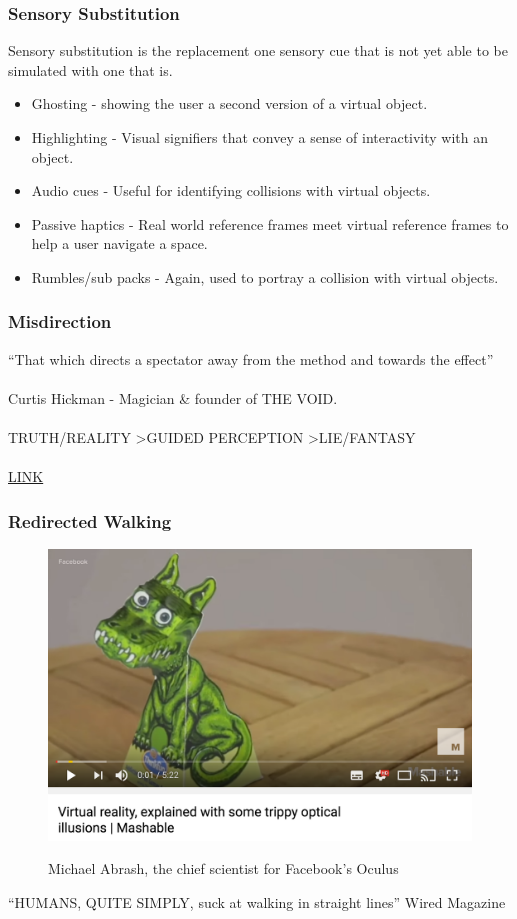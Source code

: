 \begin{frame}
	\frametitle{Sensory Substitution}
	Sensory substitution is the replacement one sensory cue that is not yet able to be simulated with one that is. 
	\begin{itemize}
		\item Ghosting - showing the user a second version of a virtual object. 
		\item Highlighting - Visual signifiers that convey a sense of interactivity with an object.
		\item Audio cues - Useful for identifying collisions with virtual objects.  
		\item Passive haptics - Real world reference frames meet virtual reference frames to help a user navigate a space. 
		\item Rumbles/sub packs - Again, used to portray a collision with virtual objects. 
	\end{itemize}
\end{frame}


\begin{frame}
	\frametitle{Misdirection}
	``That which directs a spectator away from the method and towards the effect'' \\~\\
	Curtis Hickman - Magician \& founder of THE VOID. \\~\\
	TRUTH/REALITY \textgreater  GUIDED PERCEPTION \textgreater  LIE/FANTASY \\~\\
	\href{https://www.youtube.com/watch?v=Ebwtq1HZJ2A}{LINK}
\end{frame}
	
\begin{frame}
	\frametitle{Redirected Walking}
	\begin{figure}
		\href{https://www.youtube.com/watch?v=qD3w3cAhEYU}{ \includegraphics[scale=.4]{assets/optical}  }
		\caption{Michael Abrash, the chief scientist for Facebook's Oculus}
	\end{figure}
	``HUMANS, QUITE SIMPLY, suck at walking in straight lines'' Wired Magazine
	
\end{frame}




